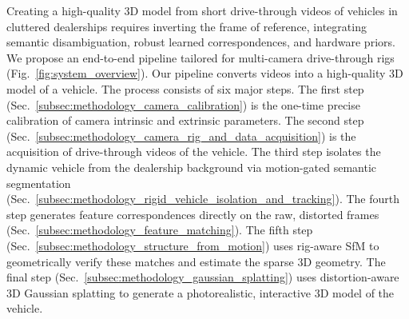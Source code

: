 \documentclass[letterpaper, 10 pt, conference]{ieeeconf}  %
\begin{document}
Creating a high-quality 3D model from short drive-through videos of vehicles in cluttered dealerships requires inverting the frame of reference, integrating semantic disambiguation, robust learned correspondences, and hardware priors. We propose an end-to-end pipeline tailored for multi-camera drive-through rigs (Fig.~\ref{fig:system_overview}). Our pipeline converts videos into a high-quality 3D model of a vehicle. The process consists of six major steps. The first step (Sec.~\ref{subsec:methodology_camera_calibration}) is the one-time precise calibration of camera intrinsic and extrinsic parameters. The second step (Sec.~\ref{subsec:methodology_camera_rig_and_data_acquisition}) is the acquisition of drive-through videos of the vehicle. The third step isolates the dynamic vehicle from the dealership background via motion-gated semantic segmentation (Sec.~\ref{subsec:methodology_rigid_vehicle_isolation_and_tracking}). The fourth step generates feature correspondences directly on the raw, distorted frames (Sec.~\ref{subsec:methodology_feature_matching}). The fifth step (Sec.~\ref{subsec:methodology_structure_from_motion}) uses rig-aware SfM to geometrically verify these matches and estimate the sparse 3D geometry. The final step (Sec.~\ref{subsec:methodology_gaussian_splatting}) uses distortion-aware 3D Gaussian splatting to generate a photorealistic, interactive 3D model of the vehicle.



\end{document}
